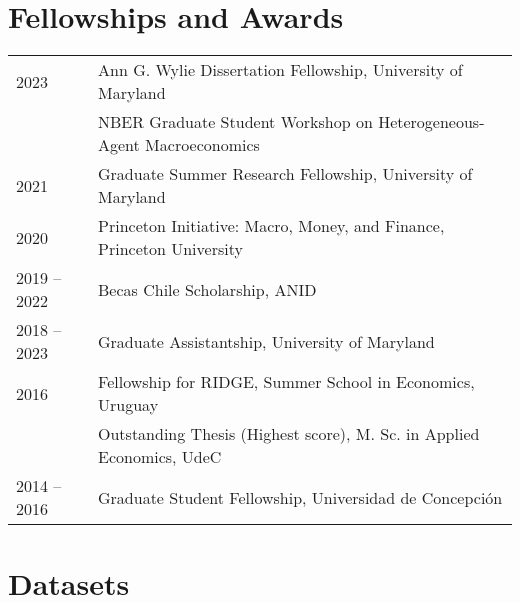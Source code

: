 \documentclass[10pt]{article}
\begin{document}
\section*{Fellowships and Awards}
\begin{tabular}{@{}p{1.8cm}p{13cm}}
    2023& Ann G. Wylie Dissertation Fellowship, University of Maryland\\
    & NBER Graduate Student Workshop on Heterogeneous-Agent Macroeconomics\\
    2021& Graduate Summer Research Fellowship, University of Maryland\\
    2020& Princeton Initiative: Macro, Money, and Finance, Princeton University\\
    2019 -- 2022& Becas Chile Scholarship, ANID\\
    2018 -- 2023& Graduate Assistantship, University of Maryland\\
    2016& Fellowship for RIDGE, Summer School in Economics, Uruguay\\
    & Outstanding Thesis (Highest score), M. Sc. in Applied Economics, UdeC\\
    2014 -- 2016& Graduate Student Fellowship, Universidad de Concepci\'on
    \end{tabular}

\iffalse
\section*{Datasets}
\end{document}
